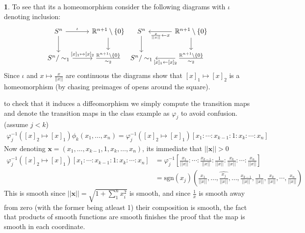 \documentclass[10.5pt]{article}
\theoremstyle{definition}
\newtheorem{pb}{}
\newcommand{\set}[1]{\{#1\}}
\newcommand{\norm}[1]{\lvert\lvert#1\rvert\rvert}
\begin{document}
\begin{pb}
        To see that its a homeomorphism consider the following diagrams with \(\iota\) denoting inclusion:
        \begin{equation*}
            \begin{tikzcd}
                S^n \arrow[r,"{\iota}"] \arrow[d,"{}"] &\mathbb{R}^{n+1}\setminus\set{0} \arrow[d,"{}"] \\
                S^n/\sim_1 \arrow[r,"{[x]_1\mapsto [x]_2} "] & \frac{\mathbb{R}^{n+1}\setminus\set{0}}{\sim_2}
            \end{tikzcd}
            \begin{tikzcd}
                S^n  \arrow[d,"{}"] &\mathbb{R}^{n+1}\setminus\set{0} \arrow[d,"{}"]\arrow[l,"{\frac{x}{\norm{x}} \leftarrow x}"] \\
                S^n/\sim_1  & \frac{\mathbb{R}^{n+1}\setminus\set{0}}{\sim_2} \arrow[l,"{[x]_1\leftarrow [x]_2} "]
            \end{tikzcd}
        \end{equation*}
        Since \(\iota\) and \(x \mapsto \frac{x}{\norm{x}}\) are continuous the diagrams show that \([x]_1 \mapsto [x]_2\) is a homeomorphism (by chasing preimages of opens around the square).
        
        to check that it induces a diffeomorphism we simply compute the transition maps and denote the transition maps in the class example as \(\varphi_j\) to avoid confusion. (assume \(j < k\))
        \begin{align*}
            \varphi_j^{-1}([x]_2 \mapsto [x]_1)\phi_k(x_1,\hdots,x_n) = \varphi_j^{-1}([x]_2 \mapsto [x]_1)[x_1:\cdots:x_{k-1}:1:x_k:\cdots:x_n]
        \end{align*}
        Now denoting \(\mathbf{x} = (x_1,\hdots,x_{k-1},1,x_k,\hdots,x_n)\), its immediate that \(\norm{\mathbf{x}} > 0\)
        \begin{align*}
            \varphi_j^{-1}([x]_2 \mapsto [x]_1)[x_1:\cdots:x_{k-1}:1:x_k:\cdots:x_n] &= \varphi_j^{-1}\left[\frac{x_1}{\norm{x}}:\cdots:\frac{x_{k-1}}{\norm{x}}:\frac{1}{\norm{x}}:\frac{x_k}{\norm{x}}:\cdots:\frac{x_n}{\norm{x}}\right] \\
            &= \text{sgn}(x_j)\left(\frac{x_1}{\norm{x}},\hdots,\widehat{\frac{x_j}{\norm{x}}},\hdots,\frac{x_{k-1}}{\norm{x}},\frac{1}{\norm{x}},\frac{x_k}{\norm{x}},\cdots,\frac{x_n}{\norm{x}}\right)
        \end{align*}
        This is smooth since \(\norm{\mathbf{x}} = \sqrt{1 + \sum_1^n x_i^2}\) is smooth, and since \(\frac{1}{x}\) is smooth away from zero (with the former being atleast 1) their composition is smooth, the fact that products of smooth functions are smooth finishes the proof that the map is smooth in each coordinate.


\end{pb}
\end{document}
